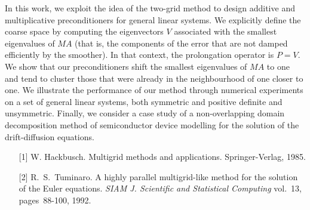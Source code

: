 \documentclass{report}
\begin{document}
In this work, we exploit the idea of the two-grid method to design
additive and multiplicative
preconditioners for general linear systems.
We explicitly define the coarse space by computing the eigenvectors $V$
associated with the
smallest eigenvalues of $MA$ (that is, the components of the error that are not
damped efficiently by the smoother).
In that context, the prolongation operator is $P = V$.
We show that our preconditioners shift the smallest eigenvalues of $MA$
to one and tend to
cluster those that were already in the neighbourhood of one closer to one.
We illustrate the performance of our method through numerical experiments
on a set of general linear systems, both symmetric and positive definite and unsymmetric.
Finally, we consider a case study of a non-overlapping domain decomposition method
of semiconductor device modelling for the solution of the drift-diffusion equations.



\begin{enumerate}
\item[{[}1{]}] W. Hackbusch.
Multigrid methods and applications.
Springer-Verlag,
1985.

\item[{[}2{]}] R.~S.~Tuminaro. A highly parallel multigrid-like method
for the solution of the
Euler equations.
{\em SIAM J. Scientific and Statistical Computing}
vol.~13, pages~88-100,
1992.

\end{enumerate}
\end{document}
